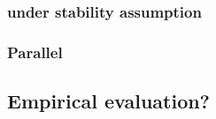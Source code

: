 \subsubsection{\pcc{} under stability assumption}
\label{ssub:cc_under_stability_assumption}

\iffalse
Haris Angelidakis, Konstantin Makarychev, and Yury Makarychev. 2017.
Algorithms for Stable and Perturbation-Resilient Problems. STOC’17
\href{http://ttic.uchicago.edu/~yury/papers/two-stable.pdf}{10.1145/3055399.3055487}
improves over the one cited in the internship description
\fi

\subsubsection{Parallel \pcc{}}
\label{ssub:parallel_cc}

\subsection{Empirical evaluation?}
\label{sub:cc_empiracal_evaluation}
